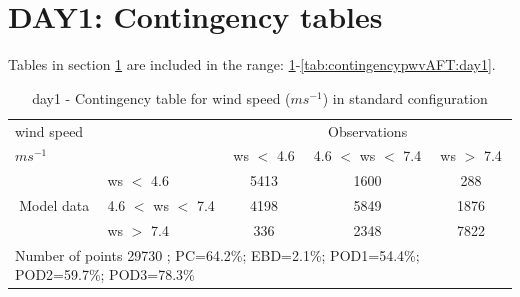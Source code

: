 \section{DAY1: Contingency tables}\label{sec:day1:cont}
Tables in section \ref{sec:day1:cont} are included in the range: \ref{tab:contingencywsBEF:day1}-\ref{tab:contingencypwvAFT:day1}.
\begin{table}[h!]
\begin{center}
\begin{tabular}{llccc}
\hline
{wind speed}                                       &                                                    & \multicolumn{3}{c}{Observations}                 \\
{$m s^{-1}$}                                       &                             & ws $<$ 4.6   & 4.6 $<$ ws $<$ 7.4 & ws $>$ 7.4 \\
\hline
\multicolumn{1}{c}{\multirow{3}{*}{Model data}}  & ws $<$ 4.6             & 5413                & 1600                       & 288              \\
                                                 & 4.6  $<$ ws $<$ 7.4 & 4198                & 5849                       & 1876              \\
                                                 & ws $>$ 7.4             & 336                & 2348                       & 7822              \\
\hline 
\multicolumn{5}{l}{ Number of points        29730 ; PC=64.2\%; EBD=2.1\%; POD1=54.4\%; POD2=59.7\%; POD3=78.3\%}                 \\
\end{tabular}
\end{center}
\caption{day1 - Contingency table for {wind speed} ($m s^{-1}$) in standard configuration}
\label{tab:contingencywsBEF:day1}
\end{table}

